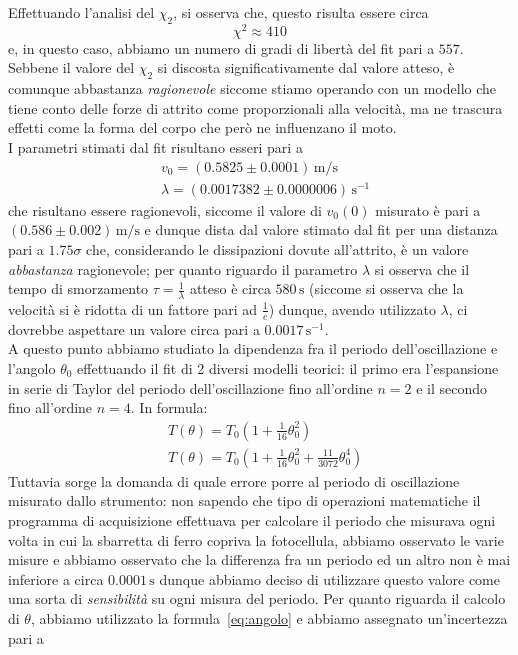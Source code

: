 \documentclass{article}
\begin{document}
\noindent Effettuando l'analisi del $\chi_2$, si osserva che, questo risulta essere circa
$$
	\chi^2 \approx 410
$$
e, in questo caso, abbiamo un numero di gradi di libertà del fit pari a $557$. Sebbene il valore del $\chi_2$ si discosta significativamente dal valore atteso, è comunque abbastanza \emph{ragionevole} siccome stiamo operando con un modello che tiene conto delle forze di attrito come proporzionali alla velocità, ma ne trascura effetti come la forma del corpo che però ne influenzano il moto. \\
I parametri stimati dal fit risultano esseri pari a
\begin{align}
	&v_0 = (0.5825 \pm 0.0001) \, \si{\meter\per\second} \\
	&\lambda = (0.0017382 \pm 0.0000006)\, \si{\second^{-1}}
\end{align}
che risultano essere ragionevoli, siccome il valore di $v_0(0)$ misurato è pari a $(0.586 \pm 0.002) \, \si{\meter\per\second}$ e dunque dista dal valore stimato dal fit per una distanza pari a $1.75\sigma$ che, considerando le dissipazioni dovute all'attrito, è un valore \emph{abbastanza} ragionevole; per quanto riguardo il parametro $\lambda$ si osserva che il tempo di smorzamento $\tau = \frac{1}{\lambda}$ atteso è circa $580 \, \si{\second}$ (siccome si osserva che la velocità si è ridotta di un fattore pari ad $\frac{1}{e}$) dunque, avendo utilizzato $\lambda$, ci dovrebbe aspettare un valore circa pari a $0.0017 \, \si{\second^{-1}}$. \\
A questo punto abbiamo studiato la dipendenza fra il periodo dell'oscillazione e l'angolo $\theta_0$ effettuando il fit di 2 diversi modelli teorici: il primo era l'espansione in serie di Taylor del periodo dell'oscillazione fino all'ordine $n=2$ e il secondo fino all'ordine $n=4$. In formula:
\begin{align}
	&T(\theta) = T_0 \left(1 + \frac{1}{16}\theta_0^2 \right) \\
	&T(\theta) = T_0 \left(1 + \frac{1}{16}\theta_0^2 + \frac{11}{3072}\theta_0^4 \right)
\end{align}
Tuttavia sorge la domanda di quale errore porre al periodo di oscillazione misurato dallo strumento: non sapendo che tipo di operazioni matematiche il programma di acquisizione effettuava per calcolare il periodo che misurava ogni volta in cui la sbarretta di ferro copriva la fotocellula, abbiamo osservato le varie misure e abbiamo osservato che la differenza fra un periodo ed un altro non è mai inferiore a circa $0.0001 \, \si{\second}$ dunque abbiamo deciso di utilizzare questo valore come \clearpage \noindent una sorta di \emph{sensibilità} su ogni misura del periodo. Per quanto riguarda il calcolo di $\theta$, abbiamo utilizzato la formula~\ref{eq:angolo} e abbiamo assegnato un'incertezza pari a
\end{document}
